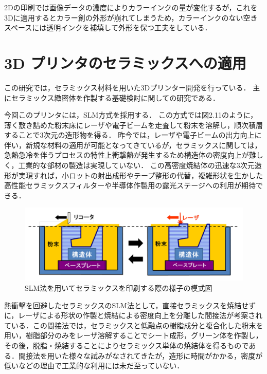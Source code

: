 2Dの印刷では画像データの濃度によりカラーインクの量が変化するが，これを3Dに適用するとカラー創の外形が崩れてしまうため，カラーインクのない空きスペースには透明インクを補填して外形を保つ工夫をしている．

\section{3D プリンタのセラミックスへの適用\cite{g}}
\label{sec:enum}
この研究では，セラミックス材料を用いた3Dプリンター開発を行っている．
主にセラミックス緻密体を作製する基礎検討に関しての研究である．

今回このプリンタには，SLM方式を採用する．
この方式では図2.11のように，薄く敷き詰めた粉末床にレーザや電子ビームを走査して粉末を溶解し，順次積層することで3次元の造形物を得る．
昨今では，レーザや電子ビームの出力向上に伴い，新規な材料の適用が可能となってきているが，セラミックスに関しては，急熱急冷を伴うプロセスの特性上衝撃熱が発生するため構造体の密度向上が難しく，工業的な部材の製造は実現していない．
この高密度焼結体の迅速な3次元造形が実現すれば，小ロットの射出成形やテープ整形の代替，複雑形状を生かした高性能セラミックスフィルターや半導体作製用の露光ステージへの利用が期待できる．

\begin{figure}[H]
  \centering
  \includegraphics[width=14truecm]{./fig/seramikku1.png}
  \caption{SLM法を用いてセラミックスを印刷する際の様子の模式図}
  \label{fig:ferret}
\end{figure}

熱衝撃を回避したセラミックスのSLM法として，直接セラミックスを焼結せずに，レーザによる形状の作製と焼結による密度向上を分離した間接法が考案されている．この間接法では，セラミックスと低融点の樹脂成分と複合化した粉末を用い，樹脂部分のみをレーザ溶解することでシート成形，グリーン体を作製し，その後，脱脂・焼結することによりセラミックス単体の焼結体を得るものである．間接法を用いた様々な試みがなされてきたが，造形に時間がかかる，密度が低いなどの理由で工業的な利用には未だ至っていない．

